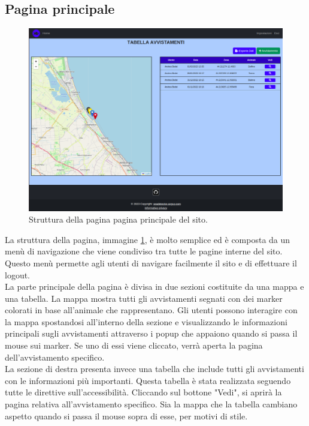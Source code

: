 \documentclass[a4paper,final,12pt]{report}
\begin{document}
\newpage

\subsection{Pagina principale}
\begin{figure}[hbtp]
\centering
\includegraphics[scale=0.27]{img_concettuale/tabellaAvv.png}
\caption{Struttura della pagina pagina principale del sito.}
\label{figura:pagprinchomepage}
\end{figure}
La struttura della pagina, immagine \ref{figura:pagprinchomepage}, è molto semplice ed è composta da un menù di navigazione che viene condiviso tra tutte le pagine interne del sito. Questo menù permette agli utenti di navigare facilmente il sito e di effettuare il logout.\\
La parte principale della pagina è divisa in due sezioni costituite da una mappa e una tabella. La mappa mostra tutti gli avvistamenti segnati con dei marker colorati in base all'animale che rappresentano. Gli utenti possono interagire con la mappa spostandosi all'interno della sezione e visualizzando le informazioni principali sugli avvistamenti attraverso i popup che appaiono quando si passa il mouse sui marker. Se uno di essi viene cliccato, verrà aperta la pagina dell'avvistamento specifico.\\
La sezione di destra presenta invece una tabella che include tutti gli avvistamenti con le informazioni più importanti. Questa tabella è stata realizzata seguendo tutte le direttive sull'accessibilità. Cliccando sul bottone "Vedi", si aprirà la pagina relativa all'avvistamento specifico. Sia la mappa che la tabella cambiano aspetto quando si passa il mouse sopra di esse, per motivi di stile.\\
\end{document}
